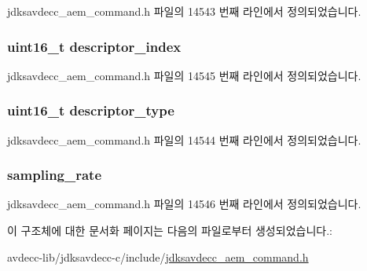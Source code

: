 jdksavdecc\+\_\+aem\+\_\+command.\+h 파일의 14543 번째 라인에서 정의되었습니다.

\subsubsection[{\texorpdfstring{descriptor\+\_\+index}{descriptor_index}}]{\setlength{\rightskip}{0pt plus 5cm}uint16\+\_\+t descriptor\+\_\+index}\hypertarget{structjdksavdecc__aem__command__set__sampling__rate_a042bbc76d835b82d27c1932431ee38d4}{}\label{structjdksavdecc__aem__command__set__sampling__rate_a042bbc76d835b82d27c1932431ee38d4}


jdksavdecc\+\_\+aem\+\_\+command.\+h 파일의 14545 번째 라인에서 정의되었습니다.

\subsubsection[{\texorpdfstring{descriptor\+\_\+type}{descriptor_type}}]{\setlength{\rightskip}{0pt plus 5cm}uint16\+\_\+t descriptor\+\_\+type}\hypertarget{structjdksavdecc__aem__command__set__sampling__rate_ab7c32b6c7131c13d4ea3b7ee2f09b78d}{}\label{structjdksavdecc__aem__command__set__sampling__rate_ab7c32b6c7131c13d4ea3b7ee2f09b78d}


jdksavdecc\+\_\+aem\+\_\+command.\+h 파일의 14544 번째 라인에서 정의되었습니다.

\subsubsection[{\texorpdfstring{sampling\+\_\+rate}{sampling_rate}}]{ sampling\+\_\+rate}\hypertarget{structjdksavdecc__aem__command__set__sampling__rate_ab17c387eb7798bbb74ccfedd6f4cf21b}{}\label{structjdksavdecc__aem__command__set__sampling__rate_ab17c387eb7798bbb74ccfedd6f4cf21b}


jdksavdecc\+\_\+aem\+\_\+command.\+h 파일의 14546 번째 라인에서 정의되었습니다.



이 구조체에 대한 문서화 페이지는 다음의 파일로부터 생성되었습니다.\+:\begin{DoxyCompactItemize}
\item 
avdecc-\/lib/jdksavdecc-\/c/include/\hyperlink{jdksavdecc__aem__command_8h}{jdksavdecc\+\_\+aem\+\_\+command.\+h}\end{DoxyCompactItemize}
